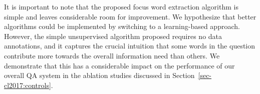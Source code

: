 It is important to note that the proposed focus word extraction algorithm is simple and leaves considerable room for improvement. We hypothesize that better algorithms could be implemented by switching to a learning-based approach. However, the simple unsupervised algorithm proposed requires no data annotations, and it captures the crucial intuition that some words in the question  contribute more towards the overall information need than others.  We demonstrate that this has a considerable impact on the performance of our overall QA system in the ablation studies discussed in Section~\ref{sec-cl2017:controls}.




